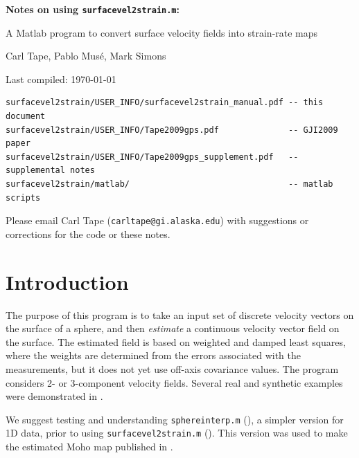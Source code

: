 \documentclass[11pt,titlepage,fleqn]{article}
\begin{document}

\begin{spacing}{1.5}
\begin{center}
{\large \bf Notes on using {\tt surfacevel2strain.m}:

A Matlab program to convert surface velocity fields into strain-rate maps}
\end{center}
\end{spacing}

\bigskip
\noindent Carl Tape, Pablo Mus\'e, Mark Simons

\noindent Last compiled: \today

\small

\begin{verbatim}
surfacevel2strain/USER_INFO/surfacevel2strain_manual.pdf -- this document
surfacevel2strain/USER_INFO/Tape2009gps.pdf              -- GJI2009 paper
surfacevel2strain/USER_INFO/Tape2009gps_supplement.pdf   -- supplemental notes
surfacevel2strain/matlab/                                -- matlab scripts
\end{verbatim}

\noindent
Please email Carl Tape ({\tt carltape@gi.alaska.edu}) with suggestions or corrections for the code or these notes.

\tableofcontents


\section{Introduction}

The purpose of this program is to take an input set of discrete velocity vectors on the surface of a sphere, and then {\em estimate} a continuous velocity vector field on the surface. The estimated field is based on weighted and damped least squares, where the weights are determined from the errors associated with the measurements, but it does not yet use off-axis covariance values.  The program considers 2- or 3-component velocity fields. Several real and synthetic examples were demonstrated in \citet{Tape2009gps}.

We suggest testing and understanding \verb+sphereinterp.m+ (), a simpler version for 1D data, prior to using \verb+surfacevel2strain.m+ (). This version was used to make the estimated Moho map published in \citet{Tape2012moho}.
\end{document}
